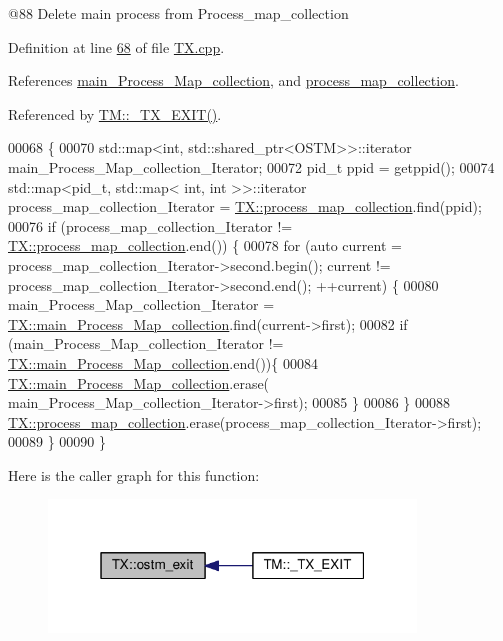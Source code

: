 @88 Delete main process from Process\+\_\+map\+\_\+collection 

Definition at line \hyperlink{_t_x_8cpp_source_l00068}{68} of file \hyperlink{_t_x_8cpp_source}{T\+X.\+cpp}.



References \hyperlink{_t_x_8h_source_l00105}{main\+\_\+\+Process\+\_\+\+Map\+\_\+collection}, and \hyperlink{_t_x_8h_source_l00109}{process\+\_\+map\+\_\+collection}.



Referenced by \hyperlink{_t_m_8cpp_source_l00108}{T\+M\+::\+\_\+\+T\+X\+\_\+\+E\+X\+I\+T()}.


\begin{DoxyCode}
00068                    \{
00070     std::map<int, std::shared\_ptr<OSTM>>::iterator main\_Process\_Map\_collection\_Iterator;
00072     pid\_t ppid = getppid();
00074     std::map<pid\_t, std::map< int, int >>::iterator process\_map\_collection\_Iterator = 
      \hyperlink{class_t_x_a2e3cd2f52fd93cf6ef3eb3c1cb830b9f_a2e3cd2f52fd93cf6ef3eb3c1cb830b9f}{TX::process\_map\_collection}.find(ppid);
00076     \textcolor{keywordflow}{if} (process\_map\_collection\_Iterator != \hyperlink{class_t_x_a2e3cd2f52fd93cf6ef3eb3c1cb830b9f_a2e3cd2f52fd93cf6ef3eb3c1cb830b9f}{TX::process\_map\_collection}.end()) \{
00078         \textcolor{keywordflow}{for} (\textcolor{keyword}{auto} current = process\_map\_collection\_Iterator->second.begin(); current != 
      process\_map\_collection\_Iterator->second.end(); ++current) \{
00080             main\_Process\_Map\_collection\_Iterator = 
      \hyperlink{class_t_x_a1a45d726894190695314464d7cd97c29_a1a45d726894190695314464d7cd97c29}{TX::main\_Process\_Map\_collection}.find(current->first);
00082             \textcolor{keywordflow}{if} (main\_Process\_Map\_collection\_Iterator != 
      \hyperlink{class_t_x_a1a45d726894190695314464d7cd97c29_a1a45d726894190695314464d7cd97c29}{TX::main\_Process\_Map\_collection}.end())\{
00084                 \hyperlink{class_t_x_a1a45d726894190695314464d7cd97c29_a1a45d726894190695314464d7cd97c29}{TX::main\_Process\_Map\_collection}.erase(
      main\_Process\_Map\_collection\_Iterator->first);      
00085             \}
00086         \}
00088         \hyperlink{class_t_x_a2e3cd2f52fd93cf6ef3eb3c1cb830b9f_a2e3cd2f52fd93cf6ef3eb3c1cb830b9f}{TX::process\_map\_collection}.erase(process\_map\_collection\_Iterator->first);
00089     \}
00090 \}
\end{DoxyCode}


Here is the caller graph for this function\+:\nopagebreak
\begin{figure}[H]
\begin{center}
\leavevmode
\includegraphics[width=277pt]{class_t_x_aa9739c5c2077454c779098db7baefc2b_aa9739c5c2077454c779098db7baefc2b_icgraph}
\end{center}
\end{figure}


